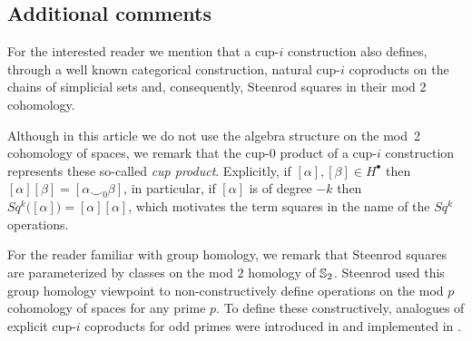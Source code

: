 \subsection{Additional comments}

\begin{remark}
	For the interested reader we mention that a cup-$i$ construction also defines, through a well known categorical construction, natural cup-$i$ coproducts on the chains of simplicial sets \cite{friedman2012simplicial} and, consequently, Steenrod squares in their mod 2 cohomology.
\end{remark}

\begin{remark} \label{r:cup product}
	Although in this article we do not use the algebra structure on the mod~2 cohomology of spaces, we remark that the cup-$0$ product of a cup-$i$ construction represents these so-called \textit{cup product}.
	Explicitly, if $[\alpha], [\beta] \in H^\bullet$ then $[\alpha][\beta] = [\alpha \smallsmile_0 \beta]$, in particular, if $[\alpha]$ is of degree $-k$ then $Sq^k\big([\alpha]\big) = [\alpha] [\alpha]$, which motivates the term squares in the name of the $Sq^k$ operations.
\end{remark}

\begin{remark}
	For the reader familiar with group homology, we remark that Steenrod squares are parameterized by classes on the mod $2$ homology of $\mathbb{S}_2$.
	Steenrod used this group homology viewpoint to non-constructively define operations on the mod $p$ cohomology of spaces \cite{steenrod1962cohomology} for any prime $p$.
	To define these constructively, analogues of explicit cup-$i$ coproducts for odd primes were introduced in \cite{medina2021maysteenrod} and implemented in \cite{medina2021computer}.
\end{remark}